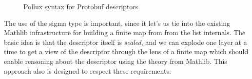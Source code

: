 \begin{figure}[h]
  \centering
  \begin{syntax}

    \alternative{\double}
    \alternative{\float}
    \alternative{\ints}
    \alternative{\intl}
    \groupleft{
        \alternative{\uints}
        \alternative{\uintl}
        \alternative{\sints}
        \alternative{\sintl}
    }
    \groupleft{
      \alternative{\fixeds}
      \alternative{\fixedl}
      \alternative{\sfixeds}
      \alternative{\sfixedl}
    }
    \groupleft{
      \alternative{\bool}
      \alternative{\str}
      \alternative{\byt}
    }

    \alternative{\sig}
    \alternative{\opt}
    \alternative{\rep}


    \alternative{\texttt{[]}}


  \end{syntax}
  \caption{Pollux syntax for Protobuf descriptors.}\label{fig:proto-desc-syn}
\end{figure}

The use of the sigma type is important, since it let's us tie into the existing
Mathlib infrastructure for building a finite map from from the list
internals. The basic idea is that the descriptor itself is \emph{sealed}, and we
can explode one layer at a time to get a view of the descriptor through the lens
of a finite map which should enable reasoning about the descriptor using the
theory from Mathlib. This approach also is designed to respect these
requirements:

